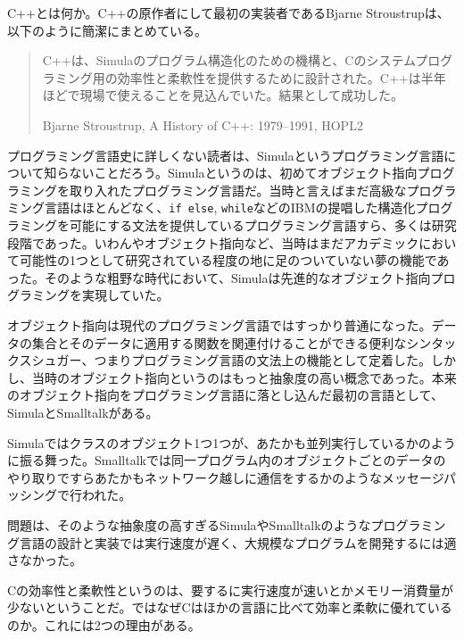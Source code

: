 
C++とは何か。C++の原作者にして最初の実装者であるBjarne Stroustrupは、以下のように簡潔にまとめている。

\begin{quote}
C++は、Simulaのプログラム構造化のための機構と、Cのシステムプログラミング用の効率性と柔軟性を提供するために設計された。C++は半年ほどで現場で使えることを見込んでいた。結果として成功した。
\begin{flushright}
Bjarne Stroustrup, A History of C++: 1979--1991, HOPL2
\end{flushright}
\end{quote}

プログラミング言語史に詳しくない読者は、Simulaというプログラミング言語について知らないことだろう。Simulaというのは、初めてオブジェクト指向プログラミングを取り入れたプログラミング言語だ。当時と言えばまだ高級なプログラミング言語はほとんどなく、\texttt{if else}, \texttt{while}などのIBMの提唱した構造化プログラミングを可能にする文法を提供しているプログラミング言語すら、多くは研究段階であった。いわんやオブジェクト指向など、当時はまだアカデミックにおいて可能性の1つとして研究されている程度の地に足のついていない夢の機能であった。そのような粗野な時代において、Simulaは先進的なオブジェクト指向プログラミングを実現していた。

オブジェクト指向は現代のプログラミング言語ではすっかり普通になった。データの集合とそのデータに適用する関数を関連付けることができる便利なシンタックスシュガー、つまりプログラミング言語の文法上の機能として定着した。しかし、当時のオブジェクト指向というのはもっと抽象度の高い概念であった。本来のオブジェクト指向をプログラミング言語に落とし込んだ最初の言語として、SimulaとSmalltalkがある。

Simulaではクラスのオブジェクト1つ1つが、あたかも並列実行しているかのように振る舞った。Smalltalkでは同一プログラム内のオブジェクトごとのデータのやり取りですらあたかもネットワーク越しに通信をするかのようなメッセージパッシングで行われた。

問題は、そのような抽象度の高すぎるSimulaやSmalltalkのようなプログラミング言語の設計と実装では実行速度が遅く、大規模なプログラムを開発するには適さなかった。

Cの効率性と柔軟性というのは、要するに実行速度が速いとかメモリー消費量が少ないということだ。ではなぜCはほかの言語に比べて効率と柔軟に優れているのか。これには2つの理由がある。

